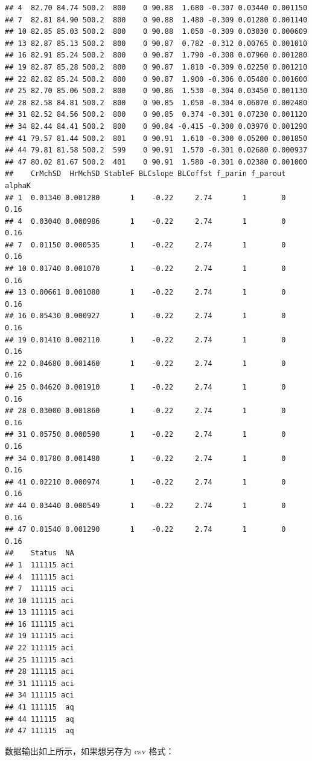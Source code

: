 \documentclass[]{krantz}
\theoremstyle{definition}
\theoremstyle{definition}
\theoremstyle{definition}
\theoremstyle{remark}
\begin{document}
\begin{verbatim}
## 4  82.70 84.74 500.2  800    0 90.88  1.680 -0.307 0.03440 0.001150
## 7  82.81 84.90 500.2  800    0 90.88  1.480 -0.309 0.01280 0.001140
## 10 82.85 85.03 500.2  800    0 90.88  1.050 -0.309 0.03030 0.000609
## 13 82.87 85.13 500.2  800    0 90.87  0.782 -0.312 0.00765 0.001010
## 16 82.91 85.24 500.2  800    0 90.87  1.790 -0.308 0.07960 0.001280
## 19 82.87 85.28 500.2  800    0 90.87  1.810 -0.309 0.02250 0.001210
## 22 82.82 85.24 500.2  800    0 90.87  1.900 -0.306 0.05480 0.001600
## 25 82.70 85.06 500.2  800    0 90.86  1.530 -0.304 0.03450 0.001130
## 28 82.58 84.81 500.2  800    0 90.85  1.050 -0.304 0.06070 0.002480
## 31 82.52 84.56 500.2  800    0 90.85  0.374 -0.301 0.07230 0.001120
## 34 82.44 84.41 500.2  800    0 90.84 -0.415 -0.300 0.03970 0.001290
## 41 79.57 81.44 500.2  801    0 90.91  1.610 -0.300 0.05200 0.001850
## 44 79.81 81.58 500.2  599    0 90.91  1.570 -0.301 0.02680 0.000937
## 47 80.02 81.67 500.2  401    0 90.91  1.580 -0.301 0.02380 0.001000
##    CrMchSD  HrMchSD StableF BLCslope BLCoffst f_parin f_parout alphaK
## 1  0.01340 0.001280       1    -0.22     2.74       1        0   0.16
## 4  0.03040 0.000986       1    -0.22     2.74       1        0   0.16
## 7  0.01150 0.000535       1    -0.22     2.74       1        0   0.16
## 10 0.01740 0.001070       1    -0.22     2.74       1        0   0.16
## 13 0.00661 0.001080       1    -0.22     2.74       1        0   0.16
## 16 0.05430 0.000927       1    -0.22     2.74       1        0   0.16
## 19 0.01410 0.002110       1    -0.22     2.74       1        0   0.16
## 22 0.04680 0.001460       1    -0.22     2.74       1        0   0.16
## 25 0.04620 0.001910       1    -0.22     2.74       1        0   0.16
## 28 0.03000 0.001860       1    -0.22     2.74       1        0   0.16
## 31 0.05750 0.000590       1    -0.22     2.74       1        0   0.16
## 34 0.01780 0.001480       1    -0.22     2.74       1        0   0.16
## 41 0.02210 0.000974       1    -0.22     2.74       1        0   0.16
## 44 0.03440 0.000549       1    -0.22     2.74       1        0   0.16
## 47 0.01540 0.001290       1    -0.22     2.74       1        0   0.16
##    Status  NA
## 1  111115 aci
## 4  111115 aci
## 7  111115 aci
## 10 111115 aci
## 13 111115 aci
## 16 111115 aci
## 19 111115 aci
## 22 111115 aci
## 25 111115 aci
## 28 111115 aci
## 31 111115 aci
## 34 111115 aci
## 41 111115  aq
## 44 111115  aq
## 47 111115  aq
\end{verbatim}

数据输出如上所示，如果想另存为 csv 格式：
\end{document}
